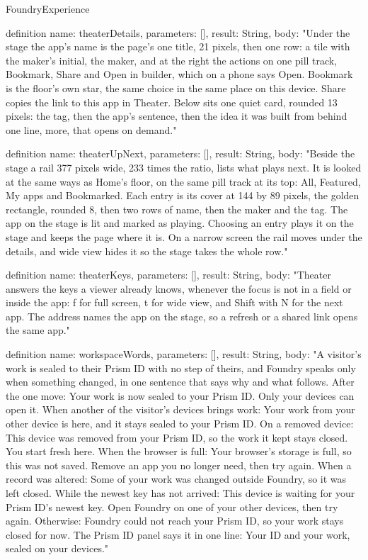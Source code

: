 \begin{lexlean}{FoundryExperience}
\begin{semanticmodule}
definition{
  name: theaterDetails,
  parameters: [],
  result: String,
  body: "Under the stage the app's name is the page's one title, 21 pixels, then one row: a tile with the maker's initial, the maker, and at the right the actions on one pill track, Bookmark, Share and Open in builder, which on a phone says Open. Bookmark is the floor's own star, the same choice in the same place on this device. Share copies the link to this app in Theater. Below sits one quiet card, rounded 13 pixels: the tag, then the app's sentence, then the idea it was built from behind one line, more, that opens on demand."
}

definition{
  name: theaterUpNext,
  parameters: [],
  result: String,
  body: "Beside the stage a rail 377 pixels wide, 233 times the ratio, lists what plays next. It is looked at the same ways as Home's floor, on the same pill track at its top: All, Featured, My apps and Bookmarked. Each entry is its cover at 144 by 89 pixels, the golden rectangle, rounded 8, then two rows of name, then the maker and the tag. The app on the stage is lit and marked as playing. Choosing an entry plays it on the stage and keeps the page where it is. On a narrow screen the rail moves under the details, and wide view hides it so the stage takes the whole row."
}

definition{
  name: theaterKeys,
  parameters: [],
  result: String,
  body: "Theater answers the keys a viewer already knows, whenever the focus is not in a field or inside the app: f for full screen, t for wide view, and Shift with N for the next app. The address names the app on the stage, so a refresh or a shared link opens the same app."
}

definition{
  name: workspaceWords,
  parameters: [],
  result: String,
  body: "A visitor's work is sealed to their Prism ID with no step of theirs, and Foundry speaks only when something changed, in one sentence that says why and what follows. After the one move: Your work is now sealed to your Prism ID. Only your devices can open it. When another of the visitor's devices brings work: Your work from your other device is here, and it stays sealed to your Prism ID. On a removed device: This device was removed from your Prism ID, so the work it kept stays closed. You start fresh here. When the browser is full: Your browser's storage is full, so this was not saved. Remove an app you no longer need, then try again. When a record was altered: Some of your work was changed outside Foundry, so it was left closed. While the newest key has not arrived: This device is waiting for your Prism ID's newest key. Open Foundry on one of your other devices, then try again. Otherwise: Foundry could not reach your Prism ID, so your work stays closed for now. The Prism ID panel says it in one line: Your ID and your work, sealed on your devices."
}


\end{semanticmodule}
\end{lexlean}
